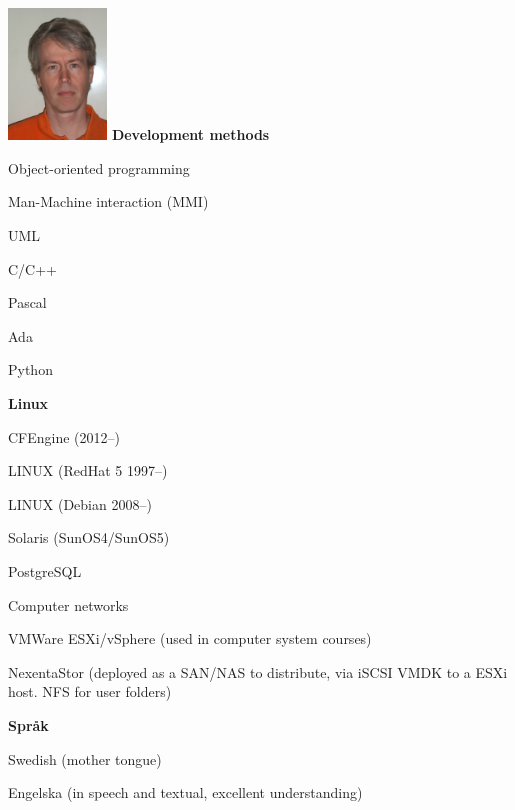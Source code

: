 \documentclass[a4paper,swedish,10pt]{article}
\begin{document}
\begin{minipage}[t]{0.24\textwidth}%
  \raggedleft%
  \vspace{-\topskip+1cm}
  \includegraphics[height=3.5cm]{idbild.jpg}
  \textbf{Development methods}
  \begin{description}[nosep]
    \raggedleft\setlength\itemsep{0.1ex}\small%
  \item Object-oriented programming
  \item Man-Machine interaction (MMI)
  \item UML
  \item C/C++
  \item Pascal
  \item Ada
  \item Python
  \end{description}
  \vspace{0.5cm}
  \textbf{Linux}
  \begin{description}[nosep,font=\sffamily\bfseries]
    \raggedleft\setlength\itemsep{0.1ex}\small%
  \item CFEngine (2012--)
  \item LINUX (RedHat 5 1997--)
  \item LINUX (Debian 2008--)
  \item Solaris (SunOS4/SunOS5)
  \item PostgreSQL
  \item Computer networks
  \item VMWare ESXi/vSphere (used in computer system courses)
  \item NexentaStor (deployed as a SAN/NAS to distribute, via iSCSI VMDK to a ESXi host. NFS for user folders)
  \end{description}
  \vspace{0.5cm}
  \textbf{Språk}
  \begin{description}[nosep,itemsep=0.1ex]
    \raggedleft\small%
  \item Swedish (mother tongue)
  \item Engelska (in speech and textual, excellent understanding)
  \end{description}
\end{minipage}
\end{document}
